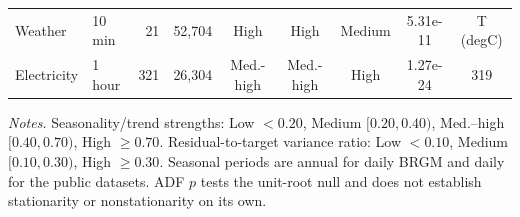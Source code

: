 \begin{table}[t]
\begin{tabular}{@{}llrrccccc@{}}
Weather & 10 min & 21 & 52,704 & High & High & Medium & 5.31e-11 & T (degC) \\
Electricity & 1 hour & 321 & 26,304 & Med.-high & Med.-high & High & 1.27e-24 & 319 \\
\bottomrule
\end{tabular}
\vspace{1mm}
\parbox{0.98\textwidth}{\scriptsize \textit{Notes.} Seasonality/trend strengths: Low $<0.20$, Medium $[0.20,0.40)$, Med.--high $[0.40,0.70)$, High $\geq0.70$. Residual-to-target variance ratio: Low $<0.10$, Medium $[0.10,0.30)$, High $\geq0.30$. Seasonal periods are annual for daily BRGM and daily for the public datasets. ADF $p$ tests the unit-root null and does not establish stationarity or nonstationarity on its own.}
\end{table}
